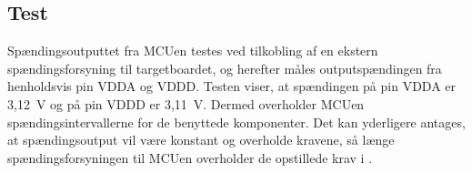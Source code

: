 \subsection{Test}
Spændingsoutputtet fra MCUen testes ved tilkobling af en ekstern spændingsforsyning til targetboardet, og herefter måles outputspændingen fra henholdsvis pin VDDA og VDDD.  \newline
Testen viser, at spændingen på pin VDDA er 3,12~V og på pin VDDD er 3,11~V. Dermed overholder MCUen spændingsintervallerne for de benyttede komponenter. Det kan yderligere antages, at spændingsoutput vil være konstant og overholde kravene, så længe spændingsforsyningen til MCUen overholder de opstillede krav i .

